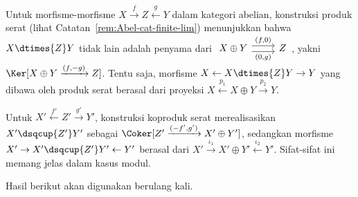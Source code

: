 \begin{catatan}\label{rem:Abel-cat-fibered-product}
	Untuk morfisme-morfisme $X \xrightarrow{f} Z \xleftarrow{g} Y$ dalam
	kategori abelian, konstruksi produk serat
	(lihat Catatan~\ref{rem:Abel-cat-finite-lim}) menunjukkan bahwa
	$X \dtimes{Z} Y$ tidak lain adalah penyama dari
	$\begin{tikzcd}
		X \oplus Y \arrow[r, yshift=0.3em, "{(f,0)}"] \arrow[r, yshift=-0.3em, "{(0,g)}"'] & Z
	\end{tikzcd}$,
	yakni $\Ker[ X \oplus Y \xrightarrow{(f, -g)} Z ]$. Tentu saja, morfisme
	$X \leftarrow X \dtimes{Z} Y \rightarrow Y$ yang dibawa oleh produk serat
	berasal dari proyeksi
	$X \xleftarrow{p_1} X \oplus Y \xrightarrow{p_2} Y$.

	Untuk $X' \xleftarrow{f'} Z' \xrightarrow{g'} Y'$, konstruksi koproduk
	serat merealisasikan $X' \dsqcup{Z'} Y'$ sebagai
	$\Coker[ Z' \xrightarrow{(-f', g')} X' \oplus Y']$, sedangkan morfisme
	$X' \rightarrow X' \dsqcup{Z'} Y' \leftarrow Y'$ berasal dari
	$X' \xrightarrow{\iota_1} X' \oplus Y'
	\xleftarrow{\iota_2} Y'$. Sifat-sifat ini memang jelas dalam kasus modul.
\end{catatan}

Hasil berikut akan digunakan berulang kali.

